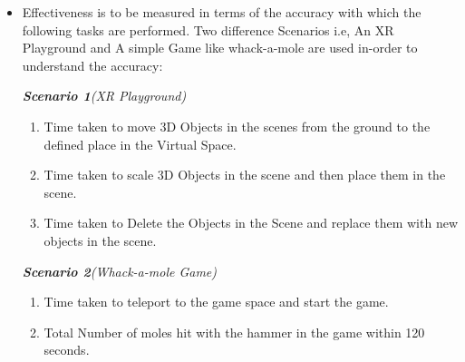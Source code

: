 \documentclass{article}
\begin{document}
\begin{itemize}
	\item Effectiveness is to be measured in terms of the accuracy with which the following tasks are performed. Two difference Scenarios i.e, An XR Playground and A simple Game like whack-a-mole are used in-order to understand the accuracy:

	      \textit{\textbf{Scenario 1}(XR Playground)}
	      \begin{enumerate}[label=\textbf{\alph*}]
		      \item Time taken to move 3D Objects in the scenes from the ground to the defined place in the Virtual Space.
		      \item Time taken to scale 3D Objects in the scene and then place them in the scene.
		      \item Time taken to Delete the Objects in the Scene and replace them with new objects in the scene.
	      \end{enumerate}

	      \textit{\textbf{Scenario 2}(Whack-a-mole Game)}
	      \begin{enumerate}[label=\textbf{\alph*}]
		      \item Time taken to teleport to the game space and start the game.
		      \item Total Number of moles hit with the hammer in the game within 120 seconds.
	      \end{enumerate}


\end{itemize}
\end{document}
